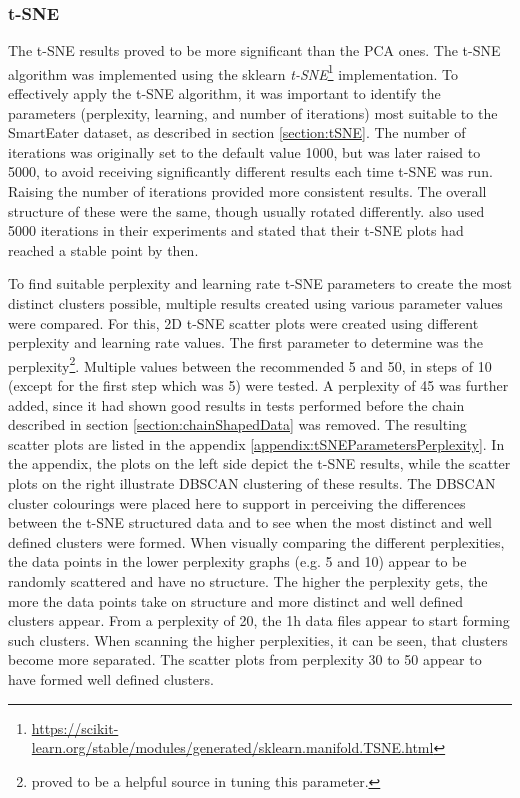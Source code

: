 \subsubsection{t-SNE}
\label{section:experimentTSNE}
The t-SNE results proved to be more significant than the PCA ones. The t-SNE algorithm was implemented using the sklearn \textit{t-SNE}\footnote{\url{https://scikit-learn.org/stable/modules/generated/sklearn.manifold.TSNE.html}} implementation.
To effectively apply the t-SNE algorithm, it was important to identify the parameters (perplexity, learning, and number of iterations) most suitable to the SmartEater dataset, as described in section \ref{section:tSNE}. The number of iterations was originally set to the default value 1000, but was later raised to 5000, to avoid receiving significantly different results each time t-SNE was run. Raising the number of iterations provided more consistent results. The overall structure of these were the same, though usually rotated differently. \textcite{wattenberg2016how} also used 5000 iterations in their experiments and stated that their t-SNE plots had reached a stable point by then.

To find suitable perplexity and learning rate t-SNE parameters to create the most distinct clusters possible, multiple results created using various parameter values were compared. For this, 2D t-SNE scatter plots were created using different perplexity and learning rate values. 
The first parameter to determine was the perplexity\footnote{\textcite{wattenberg2016how} proved to be a helpful source in tuning this parameter.}. Multiple values between the recommended 5 and 50, in steps of 10 (except for the first step which was 5) were tested. A perplexity of 45 was further added, since it had shown good results in tests performed before the chain described in section \ref{section:chainShapedData} was removed. The resulting scatter plots are listed in the appendix \ref{appendix:tSNEParametersPerplexity}. In the appendix, the plots on the left side depict the t-SNE results, while the scatter plots on the right illustrate DBSCAN clustering of these results. The DBSCAN cluster colourings were placed here to support in perceiving the differences between the t-SNE structured data and to see when the most distinct and well defined clusters were formed. When visually comparing the different perplexities, the data points in the lower perplexity graphs (e.g. 5 and 10) appear to be randomly scattered and have no structure. The higher the perplexity gets, the more the data points take on structure and more distinct and well defined clusters appear. From a perplexity of 20, the 1h data files appear to start forming such clusters. When scanning the higher perplexities, it can be seen, that clusters become more separated. The scatter plots from perplexity 30 to 50 appear to have formed well defined clusters. 

